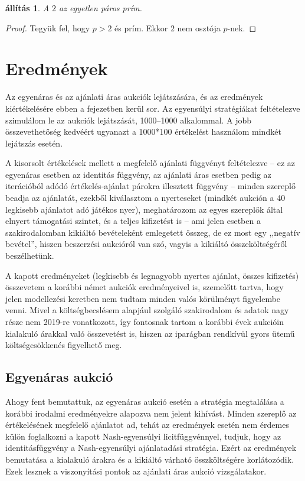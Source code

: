\documentclass[twoside, magyar, showtrims]{corvinusphd}
\theoremstyle{plain}
\newtheorem{proposition}{állítás}[chapter]
\theoremstyle{remark}
\theoremstyle{definition}
\begin{document}
\begin{proposition}
    A $2$ az egyetlen páros prím.
\end{proposition}
\begin{proof}
    Tegyük fel, hogy $p>2$ és prím. Ekkor $2$ nem osztója $p$-nek.
\end{proof}


\chapter{Eredmények}\label{results}

\scwords Az egyenáras és az ajánlati áras
aukciók lejátszására, és az
eredmények kiértékelésére ebben a fejezetben
kerül sor. Az egyensúlyi stratégiákat
feltételezve szimulálom le az aukciók lejátszását,
1000--1000 alkalommal. A jobb összevethetőség kedvéért
ugyanazt a 1000*100 értékelést használom
mindkét lejátszás esetén. 

A kisorsolt értékelések mellett a megfelelő ajánlati
függvényt feltételezve -- ez az egyenáras esetben
az identitás függvény, az ajánlati áras esetben
pedig az iterációból adódó értékelés-ajánlat
párokra illesztett függvény --
minden szereplő beadja az ajánlatát,
ezekből kiválasztom a nyerteseket (mindkét aukción
a 40 legkisebb ajánlatot adó játékos nyer), meghatározom
az egyes szereplők által elnyert támogatási szintet,
és a teljes kifizetést is -- ami jelen esetben a szakirodalomban
kikiáltó bevételeként emlegetett összeg, de ez most egy
,,negatív bevétel'', hiszen beszerzési aukcióról van szó,
vagyis a kikiáltó összeköltségéről beszélhetünk.

A kapott eredményeket (legkisebb és legnagyobb nyertes ajánlat,
összes kifizetés) összevetem a korábbi német aukciók
eredményeivel is, szemelőtt tartva, hogy jelen modellezési
keretben nem tudtam minden valós körülményt figyelembe venni.
Mivel a költségbecslésem alapjául szolgáló szakirodalom
és adatok nagy része nem 2019-re vonatkozott, így 
fontosnak tartom a korábbi évek aukcióin kialakuló 
árakkal való összevetést is, hiszen az iparágban
rendkívül gyors ütemű költségcsökkenés figyelhető meg.

\section{Egyenáras aukció}

Ahogy fent bemutattuk, az egyenáras aukció esetén a stratégia megtalálása
a korábbi irodalmi eredményekre alapozva nem jelent kihívást.
Minden szereplő az értékelésének megfelelő ajánlatot ad, 
tehát az eredmények esetén nem érdemes külön foglalkozni
a kapott Nash-egyensúlyi licitfüggvénnyel, tudjuk, hogy
az identitásfüggvény a Nash-egyensúlyi ajánlatadási stratégia.
Ezért az eredmények bemutatása a kialakuló árakra 
és a kikiáltó várható összköltségére korlátozódik.
Ezek lesznek a viszonyítási pontok az ajánlati áras aukció vizsgálatakor.
\end{document}
